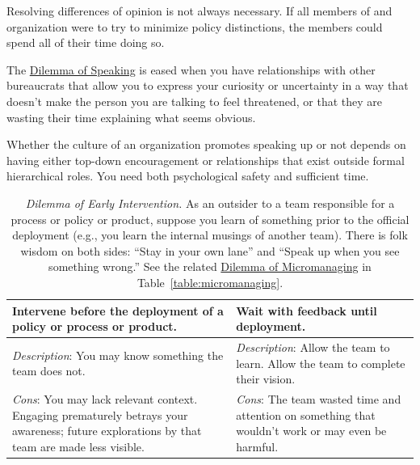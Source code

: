 Resolving differences of opinion is not always necessary. If all members of and organization were to try to minimize policy distinctions, the members could spend all of their time doing so. 

The \href{table:speak-up-or-hold-back}{Dilemma of Speaking} is eased when you have relationships with other bureaucrats that allow you to express your curiosity or uncertainty in a way that doesn't make the person you are talking to feel threatened, or that they are wasting their time explaining what seems obvious. 

Whether the culture of an organization promotes speaking up or not depends on having either top-down encouragement or relationships that exist outside formal hierarchical roles. You need both psychological safety and sufficient time. 
  
\begin{center}
\begin{table}[H] %
\begin{tabular}{ | m{\dilemmatablewidth}| m{\dilemmatablewidth} | } 
  \hline
  \textbf{Intervene before the deployment of a policy or process or product.} &
  \textbf{Wait with feedback until deployment.} \\
  \hline
  \textit{Description}: You may know something the team does not. & 
  \textit{Description}: Allow the team to learn. Allow the team to complete their vision. \\
  \hline
  \textit{Cons}: You may lack relevant context. Engaging prematurely betrays your awareness; future explorations by that team are made less visible. & 
  \textit{Cons}: The team wasted time and attention on something that wouldn't work or may even be harmful. \\
  \hline
\end{tabular}
\caption{
\textit{Dilemma of Early Intervention.}
As an outsider to a team responsible for a process or policy or product, suppose you learn of something prior to the official deployment (e.g., you learn the internal musings of another team). There is folk wisdom on both sides: 
``Stay in your own lane'' 
and 
``Speak up when you see something wrong.''
See the related \href{table:micromanaging}{Dilemma of Micromanaging} in Table~\ref{table:micromanaging}.}
\label{table:early-intervention}
\end{table}
\end{center}

